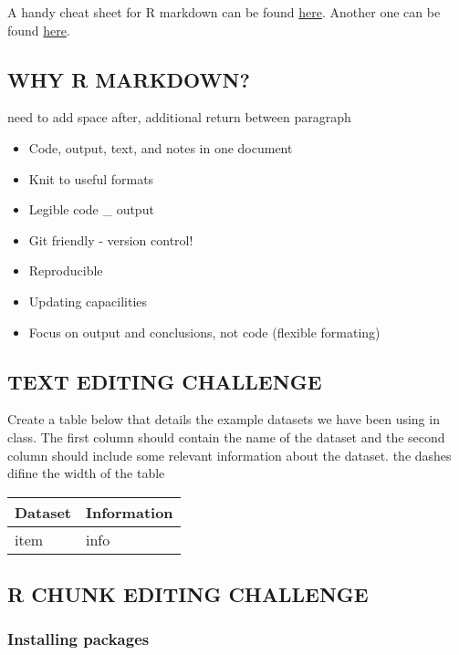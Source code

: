 \documentclass[]{article}
\providecommand{\tightlist}{%
  \setlength{\itemsep}{0pt}\setlength{\parskip}{0pt}}
\begin{document}
A handy cheat sheet for R markdown can be found
\href{https://www.rstudio.com/wp-content/uploads/2015/03/rmarkdown-reference.pdf}{here}.
Another one can be found
\href{https://www.rstudio.com/wp-content/uploads/2015/02/rmarkdown-cheatsheet.pdf}{here}.

\subsection{WHY R MARKDOWN?}\label{why-r-markdown}

 need to add space after, additional return between paragraph

\begin{itemize}
\tightlist
\item
  Code, output, text, and notes in one document
\item
  Knit to useful formats
\item
  Legible code \_ output
\item
  Git friendly - version control!
\item
  Reproducible
\item
  Updating capacilities
\item
  Focus on output and conclusions, not code (flexible formating)
\end{itemize}

\subsection{TEXT EDITING CHALLENGE}\label{text-editing-challenge}

Create a table below that details the example datasets we have been
using in class. The first column should contain the name of the dataset
and the second column should include some relevant information about the
dataset. the dashes difine the width of the table

\begin{longtable}[]{@{}ll@{}}
\toprule
Dataset & Information\tabularnewline
\midrule
\endhead
item & info\tabularnewline
\bottomrule
\end{longtable}

\subsection{R CHUNK EDITING CHALLENGE}\label{r-chunk-editing-challenge}

\subsubsection{Installing packages}\label{installing-packages}
\end{document}
